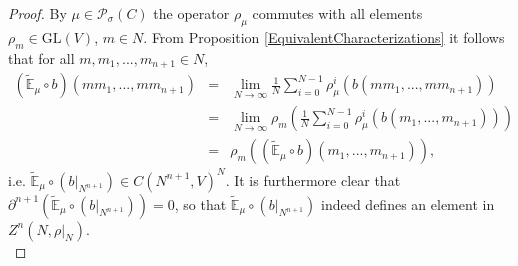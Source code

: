 \documentclass[a4paper,11pt,reqno]{amsart}
\numberwithin{equation}{section}
\theoremstyle{definition}
\theoremstyle{remark}
\theoremstyle{remark}
\begin{document}
\begin{proof} By $\mu\in\mathcal{P}_{\sigma}(C)$ the operator $\rho_{\mu}$ commutes with all elements $\rho_{m}\in\text{GL}(V)$, $m\in N$. From Proposition \ref{EquivalentCharacterizations} it follows that for all $m,m_{1},...,m_{n+1}\in N$, 
\begin{eqnarray*}
(\widetilde{\mathbb{E}}_{\mu}\circ b)(mm_{1},...,mm_{n+1}) & = & \lim_{N\rightarrow\infty}\frac{1}{N}\sum_{i=0}^{N-1}\rho_{\mu}^{i}\left(b(mm_{1},...,mm_{n+1})\right)\\
 & = & \lim_{N\rightarrow\infty}\rho_{m}\left(\frac{1}{N}\sum_{i=0}^{N-1}\rho_{\mu}^{i}\left(b(m_{1},...,m_{n+1})\right)\right)\\
 & = & \rho_{m}\left((\widetilde{\mathbb{E}}_{\mu}\circ b)(m_{1},...,m_{n+1})\right),
\end{eqnarray*}
i.e. $\widetilde{\mathbb{E}}_{\mu}\circ(b|_{N^{n+1}})\in C(N^{n+1},V)^{N}$. It is furthermore clear that $\partial^{n+1}(\widetilde{\mathbb{E}}_{\mu}\circ(b|_{N^{n+1}}))=0$, so that $\widetilde{\mathbb{E}}_{\mu}\circ(b|_{N^{n+1}})$ indeed defines an element in $Z^{n}(N,\rho|_{N})$.\\


\end{proof}
\end{document}
